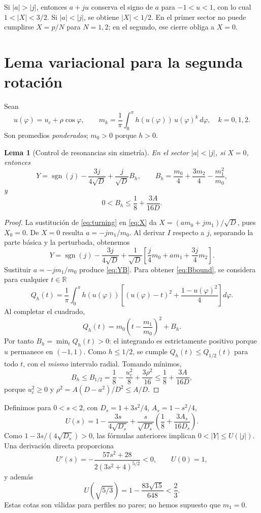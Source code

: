 \documentclass[11pt,a4paper]{article}
\newtheorem{lemma}[theorem]{Lema}
\theoremstyle{remark}\newtheorem{remark}[theorem]{Observación}
\newcommand{\R}{\mathbb R}
\newcommand{\sgn}{\operatorname{sgn}}
\begin{document}
Si $|a|>|j|$, entonces $a+ju$ conserva el signo de $a$ para $-1<u<1$, con lo cual $1<|X|<3/2$. Si $|a|<|j|$, se obtiene $|X|<1/2$. En el primer sector no puede cumplirse $X=p/N$ para $N=1,2$; en el segundo, ese cierre obliga a $X=0$.

\section{Lema variacional para la segunda rotación}
Sean
\[
u(\varphi)=u_c+\rho\cos\varphi,\qquad
m_k=\frac1\pi\int_0^\pi h(u(\varphi))\,u(\varphi)^k\,d\varphi,\quad k=0,1,2.
\]
Son promedios \emph{ponderados}; $m_0>0$ porque $h>0$.

\begin{lemma}[Control de resonancias sin simetría]\label{lem:B}
En el sector $|a|<|j|$, si $X=0$, entonces
\begin{equation}\label{eq:YB}
Y=\sgn(j)-\frac{3j}{4\sqrt D}+\frac{j}{\sqrt D}B_h,
\qquad
B_h=\frac{m_0}{4}+\frac{3m_2}{4}-\frac{m_1^2}{m_0},
\end{equation}
y
\begin{equation}\label{eq:Bbound}
\boxed{0<B_h\le\frac18+\frac{3A}{16D}.}
\end{equation}
\end{lemma}
\begin{proof}
La sustitución de \eqref{eq:turning} en \eqref{eq:X} da $X=(am_0+jm_1)/\sqrt D$, pues $X_0=0$. De $X=0$ resulta $a=-jm_1/m_0$. Al derivar $I$ respecto a $j$, separando la parte básica y la perturbada, obtenemos
\[
Y=\sgn(j)-\frac{3j}{4\sqrt D}+\frac{1}{\sqrt D}\left[\frac j4m_0+am_1+\frac{3j}{4}m_2\right].
\]
Sustituir $a=-jm_1/m_0$ produce \eqref{eq:YB}. Para obtener \eqref{eq:Bbound}, se considera para cualquier $t\in\R$
\[
Q_h(t)=\frac1\pi\int_0^\pi h(u(\varphi))\left[(u(\varphi)-t)^2+\frac{1-u(\varphi)^2}{4}\right]d\varphi.
\]
Al completar el cuadrado,
\[
Q_h(t)=m_0\left(t-\frac{m_1}{m_0}\right)^2+B_h.
\]
Por tanto $B_h=\min_tQ_h(t)>0$: el integrando es estrictamente positivo porque $u$ permanece en $(-1,1)$. Como $h\le1/2$, se cumple $Q_h(t)\le Q_{1/2}(t)$ para todo $t$, con el \emph{mismo} intervalo radial. Tomando mínimos,
\[
B_h\le B_{1/2}=\frac18-\frac{u_c^2}{8}+\frac{3\rho^2}{16}\le\frac18+\frac{3A}{16D},
\]
porque $u_c^2\ge0$ y $\rho^2=A(D-a^2)/D^2\le A/D$.
\end{proof}

Definimos para $0<s<2$, con $D_s=1+3s^2/4$, $A_s=1-s^2/4$,
\begin{equation}\label{eq:U}
U(s)=1-\frac{3s}{4\sqrt{D_s}}+\frac{s}{\sqrt{D_s}}\left(\frac18+\frac{3A_s}{16D_s}\right).
\end{equation}
Como $1-3s/(4\sqrt{D_s})>0$, las fórmulas anteriores implican $0<|Y|\le U(|j|)$. Una derivación directa proporciona
\begin{equation}\label{eq:Uprime}
U'(s)=-\frac{57s^2+28}{2(3s^2+4)^{5/2}}<0,\qquad U(0)=1,
\end{equation}
y además
\begin{equation}\label{eq:Uthreshold}
U\left(\sqrt{5/3}\right)=1-\frac{83\sqrt{15}}{648}<\frac23.
\end{equation}
Estas cotas son válidas para perfiles no pares; no hemos supuesto que $m_1=0$.
\end{document}
